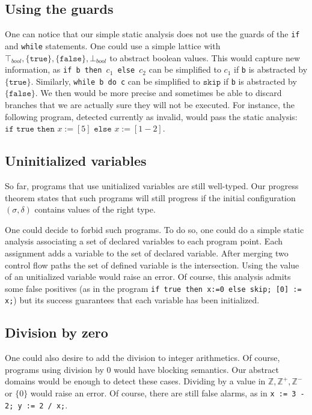 \subsection*{Using the guards}
One can notice that our simple static analysis does not use the guards of the \texttt{if} and \texttt{while} statements. One could use a simple lattice with $\top_{bool}, \lbrace \texttt{true} \rbrace, \lbrace \texttt{false} \rbrace, \bot_{bool}$ to abstract boolean values. This would capture new information, as \texttt{if b then $c_1$ else $c_2$} can be simplified to $c_1$ if \texttt{b} is abstracted by $\lbrace \texttt{true} \rbrace$.
Similarly, \texttt{while b do c} can be simplified to $\texttt{skip}$ if \texttt{b} is abstracted by $\lbrace \texttt{false} \rbrace$.
We then would be more precise and sometimes be able to discard branches that we are actually sure they will not be executed.
For instance, the following program, detected currently as invalid, would pass the static analysis: $\texttt{if true then~} x:= [5] \texttt{~else~} x:= [1 - 2]$.

\subsection*{Uninitialized variables}

So far, programs that use unitialized variables are still well-typed. Our progress theorem states that such programs will still progress if the initial configuration $(\sigma,\delta)$ contains values of the right type.

One could decide to forbid such programs. To do so, one could do a simple static analysis associating a set of declared variables to each program point. Each assignment adds a variable to the set of declared variable. After merging two control flow paths the set of defined variable is the intersection. Using the value of an unitialized variable would raise an error. Of course, this analysis admits some false positives (as in the program \texttt{if true then x:=0 else skip; [0] := x;}) but its success guarantees that each variable has been initialized. 

\subsection*{Division by zero}

One could also desire to add the division to integer arithmetics. Of course, programs using division by 0 would have blocking semantics. Our abstract domains would be enough to detect these cases. Dividing by a value in $\mathbb{Z}, \mathbb{Z^+}, \mathbb{Z^-}$ or $\lbrace 0 \rbrace$ would raise an error. Of course, there are still false alarms, as in \texttt{x := 3 - 2; y := 2 / x;}.


